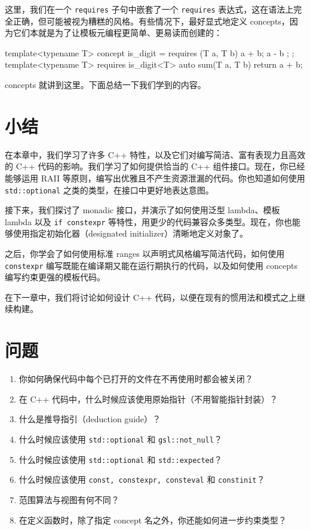 这里，我们在一个 \texttt{requires} 子句中嵌套了一个 \texttt{requires} 表达式，这在语法上完全正确，但可能被视为糟糕的风格。有些情况下，最好显式地定义 concepts，因为它们本就是为了让模板元编程更简单、更易读而创建的：

\begin{codebox}[cpp]
template<typename T>
concept is_digit = requires (T a, T b) { a + b; a - b ; };
template<typename T>
requires is_digit<T>
auto sum(T a, T b) { return a + b; }
\end{codebox}

concepts 就讲到这里。下面总结一下我们学到的内容。

\section{小结}

在本章中，我们学习了许多 C++ 特性，以及它们对编写简洁、富有表现力且高效的 C++ 代码的影响。我们学习了如何提供恰当的 C++ 组件接口。现在，你已经能够运用 RAII 等原则，编写出优雅且不产生资源泄漏的代码。你也知道如何使用 \texttt{std::\allowbreak{}optional} 之类的类型，在接口中更好地表达意图。

接下来，我们探讨了 monadic 接口，并演示了如何使用泛型 lambda、模板 lambda 以及 \texttt{if constexpr} 等特性，用更少的代码兼容众多类型。现在，你也能够使用指定初始化器（designated initializer）清晰地定义对象了。

之后，你学会了如何使用标准 ranges 以声明式风格编写简洁代码，如何使用 \texttt{constexpr} 编写既能在编译期又能在运行期执行的代码，以及如何使用 concepts 编写约束更强的模板代码。

在下一章中，我们将讨论如何设计 C++ 代码，以便在现有的惯用法和模式之上继续构建。

\section{问题}

\begin{enumerate}
\item 你如何确保代码中每个已打开的文件在不再使用时都会被关闭？
\item 在 C++ 代码中，什么时候应该使用原始指针（不用智能指针封装）？
\item 什么是推导指引（deduction guide）？
\item 什么时候应该使用 \texttt{std::\allowbreak{}optional} 和 \texttt{gsl::\allowbreak{}not\_\allowbreak{}null}？
\item 什么时候应该使用 \texttt{std::\allowbreak{}optional} 和 \texttt{std::\allowbreak{}expected}？
\item 什么时候应该使用 \texttt{const,\allowbreak{} constexpr,\allowbreak{} consteval} 和 \texttt{constinit}？
\item 范围算法与视图有何不同？
\item 在定义函数时，除了指定 concept 名之外，你还能如何进一步约束类型？
\end{enumerate}

